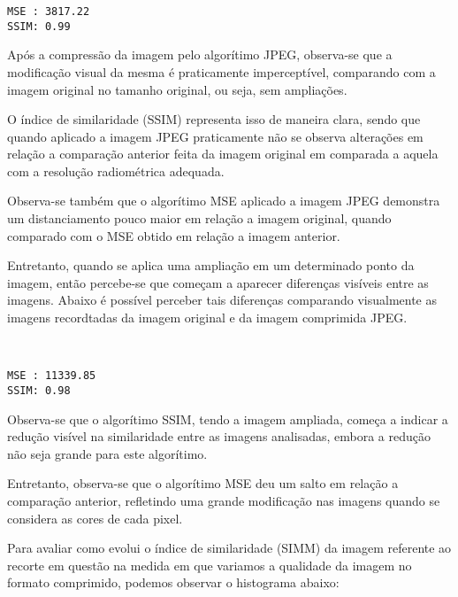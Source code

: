 \documentclass{IEEEtran}
\begin{document}
    \begin{Verbatim}[commandchars=\\\{\}]
MSE : 3817.22
SSIM: 0.99

    \end{Verbatim}

    Após a compressão da imagem pelo algorítimo JPEG, observa-se que a
modificação visual da mesma é praticamente imperceptível, comparando com
a imagem original no tamanho original, ou seja, sem ampliações.

O índice de similaridade (SSIM) representa isso de maneira clara, sendo
que quando aplicado a imagem JPEG praticamente não se observa alterações
em relação a comparação anterior feita da imagem original em comparada a
aquela com a resolução radiométrica adequada.

Observa-se também que o algorítimo MSE aplicado a imagem JPEG demonstra
um distanciamento pouco maior em relação a imagem original, quando
comparado com o MSE obtido em relação a imagem anterior.

Entretanto, quando se aplica uma ampliação em um determinado ponto da
imagem, então percebe-se que começam a aparecer diferenças visíveis
entre as imagens. Abaixo é possível perceber tais diferenças comparando
visualmente as imagens recordtadas da imagem original e da imagem
comprimida JPEG.


    \begin{center}
    \end{center}
    { \hspace*{\fill} \\}
    
    \begin{Verbatim}[commandchars=\\\{\}]
MSE : 11339.85
SSIM: 0.98

    \end{Verbatim}

    Observa-se que o algorítimo SSIM, tendo a imagem ampliada, começa a
indicar a redução visível na similaridade entre as imagens analisadas,
embora a redução não seja grande para este algorítimo.

Entretanto, observa-se que o algorítimo MSE deu um salto em relação a
comparação anterior, refletindo uma grande modificação nas imagens
quando se considera as cores de cada pixel.

    Para avaliar como evolui o índice de similaridade (SIMM) da imagem
referente ao recorte em questão na medida em que variamos a qualidade da
imagem no formato comprimido, podemos observar o histograma abaixo:
\end{document}
